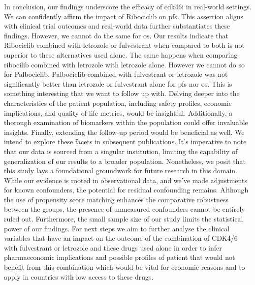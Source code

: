 In conclusion, our findings underscore the efficacy of \ac{cdk46i} in real-world settings. We can confidently affirm the impact of Ribociclib on \ac{pfs}. This assertion aligns with clinical trial outcomes and real-world data further substantiates these findings. However, we cannot do the same for \ac{os}. Our results indicate that Ribociclib combined with letrozole or fulvestrant when compared to both is not superior to these alternatives used alone. The same happens when comparing ribocilib combined with letrozole with letrozole alone. 
However we cannot do so for Palbociclib. Palbociclib combined with fulvestrant or letrozole was not significantly better than letrozole or fulvestrant alone for \ac{pfs} nor \ac{os}. This is something interesting that we want to follow up with.
Delving deeper into the characteristics of the patient population, including safety profiles, economic implications, and quality of life metrics, would be insightful. Additionally, a thorough examination of biomarkers within the population could offer invaluable insights. Finally, extending the follow-up period would be beneficial as well. We intend to explore these facets in subsequent publications.
It’s imperative to note that our data is sourced from a singular institution, limiting the capability of generalization of our results to a broader population. Nonetheless, we posit that this study lays a foundational groundwork for future research in this domain. While our evidence is rooted in observational data, and we’ve made adjustments for known confounders, the potential for residual confounding remains. Although the use of propensity score matching enhances the comparative robustness between the groups, the presence of unmeasured confounders cannot be entirely ruled out. Furthermore, the small sample size of our study limits the statistical power of our findings. For next steps we aim to further analyse the clinical variables that have an impact on the outcome of the combination of CDK4/6 with fulvestrant or letrozole and these drugs used alone in order to infer pharmaeconomic implications and possible profiles of patient that would not benefit from this combination which would be vital for economic reasons and to apply in countries with low access to these drugs.